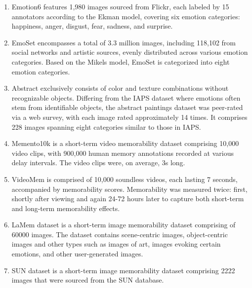 \begin{enumerate}
        \item Emotion6 \cite{peng2015mixed} features 1,980 images sourced from Flickr, each labeled by 15 annotators according to the Ekman model, covering six emotion categories: happiness, anger, disgust, fear, sadness, and surprise.
        \item EmoSet \cite{yang2023emoset} encompasses a total of 3.3 million images, including 118,102 from social networks and artistic sources, evenly distributed across various emotion categories. Based on the Mikels model, EmoSet is categorized into eight emotion categories.
        \item Abstract \cite{machajdik2010affective} exclusively consists of color and texture combinations without recognizable objects. Differing from the IAPS dataset where emotions often stem from identifiable objects, the abstract paintings dataset was peer-rated via a web survey, with each image rated approximately 14 times. It comprises 228 images spanning eight categories similar to those in IAPS.


        \item Memento10k\cite{newman2020multimodal} is a short-term video memorability dataset comprising 10,000 video clips,  with 900,000 human memory annotations recorded at various delay intervals. The video clips were, on average, 3s long.
        
        \item VideoMem \cite{cohendet2019videomem} is comprised of 10,000 soundless videos, each lasting 7 seconds, accompanied by memorability scores. Memorability was measured twice: first, shortly after viewing and again 24-72 hours later to capture both short-term and long-term memorability effects.
        
        \item LaMem \cite{khosla2015understanding} dataset is a short-term image memorability dataset comprising of 60000 images. The dataset contains scene-centric images, object-centric images and other types such as images
        of art, images evoking certain emotions, and other user-generated images.
        \item SUN \cite{isola2011makes} dataset is a short-term image memorability dataset comprising 2222 images that were sourced from the SUN database. 
   

\end{enumerate}
